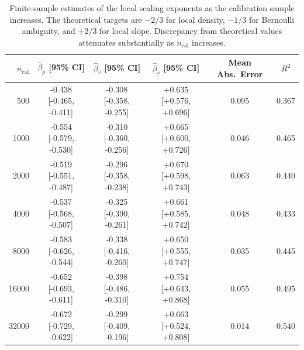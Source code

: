 \begin{table}[htbp]
\centering
\small
\setlength{\tabcolsep}{2.5pt}
\caption{Finite-sample estimates of the local scaling exponents as the calibration sample increases. The theoretical targets are $-2/3$ for local density, $-1/3$ for Bernoulli ambiguity, and $+2/3$ for local slope. Discrepancy from theoretical values attenuates substantially as $n_{\mathrm{cal}}$ increases.}
\label{tab:exponent_convergence}
\begin{tabular}{rccccc}
\toprule
$n_{\mathrm{cal}}$ & $\hat\beta_\rho$ [95\% CI] & $\hat\beta_v$ [95\% CI] & $\hat\beta_s$ [95\% CI] & Mean Abs.\ Error & $R^2$ \\
\midrule
500 & -0.438 [-0.465, -0.411] & -0.308 [-0.358, -0.255] & +0.635 [+0.576, +0.696] & 0.095 & 0.367 \\
1000 & -0.554 [-0.579, -0.530] & -0.310 [-0.360, -0.256] & +0.665 [+0.600, +0.726] & 0.046 & 0.465 \\
2000 & -0.519 [-0.551, -0.487] & -0.296 [-0.358, -0.238] & +0.670 [+0.598, +0.743] & 0.063 & 0.440 \\
4000 & -0.537 [-0.568, -0.507] & -0.325 [-0.390, -0.261] & +0.661 [+0.585, +0.742] & 0.048 & 0.433 \\
8000 & -0.583 [-0.626, -0.544] & -0.338 [-0.416, -0.260] & +0.650 [+0.555, +0.747] & 0.035 & 0.445 \\
16000 & -0.652 [-0.693, -0.611] & -0.398 [-0.486, -0.310] & +0.754 [+0.643, +0.868] & 0.055 & 0.495 \\
32000 & -0.672 [-0.729, -0.622] & -0.299 [-0.409, -0.196] & +0.663 [+0.524, +0.808] & 0.014 & 0.540 \\
\bottomrule
\end{tabular}
\end{table}
